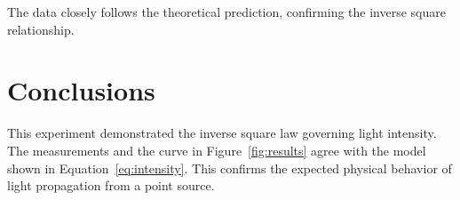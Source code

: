 \documentclass{article}
\begin{document}
The data closely follows the theoretical prediction, confirming the inverse square relationship.

\section{Conclusions}
This experiment demonstrated the inverse square law governing light intensity. The measurements and the curve in Figure~\ref{fig:results} agree with the model shown in Equation~\ref{eq:intensity}. This confirms the expected physical behavior of light propagation from a point source.
\end{document}
